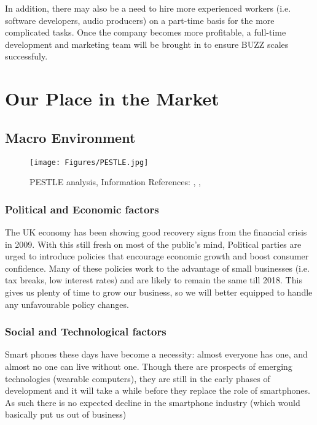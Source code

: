 \documentclass[12pt]{article}
\begin{document}
In addition, there may also be a need to hire more experienced workers (i.e. software developers, audio producers) on a part-time basis for the more complicated tasks. Once the company becomes more profitable, a full-time development and marketing team will be brought in to ensure BUZZ scales successfuly.

\section{Our Place in the Market}

\subsection{Macro Environment}

\begin{figure}
    \centering
    \texttt{[image: Figures/PESTLE.jpg]}
    \caption{PESTLE analysis, Information References: \cite{PWC2015}, \cite{eMarketer}, \cite{HM_Treasury2015}}
    \label{fig:pestle}
\end{figure}

\subsubsection*{Political and Economic factors}
The UK economy has been showing good recovery signs from the financial crisis in 2009. With this still fresh on most of the public's mind, Political parties are urged to introduce policies that encourage economic growth and boost consumer confidence. Many of these policies work to the advantage of small businesses (i.e. tax breaks, low interest rates) and are likely to remain the same till 2018. %
This gives us plenty of time to grow our business, so we will better equipped to handle any unfavourable policy changes.

\subsubsection*{Social and Technological factors}
Smart phones these days have become a necessity: almost everyone has one, and almost no one can live without one. Though there are prospects of emerging technologies (wearable computers), they are still in the early phases of development and it will take a while before they replace the role of smartphones. As such there is no expected decline in the smartphone industry (which would basically put us out of business)
\end{document}
